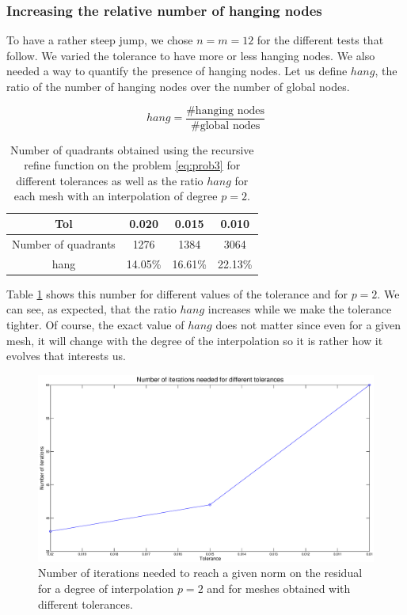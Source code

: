 \subsubsection{Increasing the relative number of hanging nodes}

To have a rather steep jump, we chose $n=m=12$ for the different tests that follow. We varied the tolerance to have more or less hanging nodes. We also needed a way to quantify the presence of hanging nodes. Let us define $hang$, the ratio of the number of hanging nodes over the number of global nodes. 

$$ hang = \frac{\#\text{hanging nodes}}{\#\text{global nodes}}$$

\begin{table}
\centering
\begin{tabular}{c|ccc}
\hline
Tol & 0.020 & 0.015 & 0.010\\
\hline
Number of quadrants &1276 & 1384 & 3064 \\
\hline
hang & 14.05\% & 16.61\% & 22.13\%\\
\hline
\end{tabular}
\caption{Number of quadrants obtained using the recursive refine function on the problem \ref{eq:prob3} for different tolerances as well as the ratio $hang$ for each mesh with an interpolation of degree $p=2$.}
\label{fine_hanging_ratio}
\end{table}

Table \ref{fine_hanging_ratio} shows this number for different values of the tolerance and for $p=2$. We can see, as expected, that the ratio $hang$ increases while we make the tolerance tighter. Of course, the exact value of $hang$ does not matter since even for a given mesh, it will change with the degree of the interpolation so it is rather how it evolves that interests us. 

\begin{figure}
\centering
\includegraphics[scale=0.35]{Results/fine_hang_plot.eps}
\caption{Number of iterations needed to reach a given norm on the residual for a degree of interpolation $p=2$ and for meshes obtained with different tolerances.}
\label{fine_hang_plot}
\end{figure}


